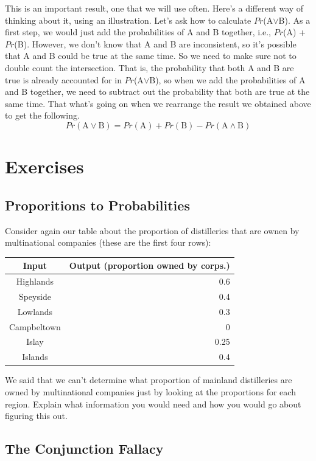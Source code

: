 \documentclass[]{tufte-book}
\begin{document}
This is an important result, one that we will use often. Here's a different way of thinking about it, using an illustration. Let's ask how to calculate \(Pr\)(A\(\vee\)B). As a first step, we would just add the probabilities of A and B together, i.e., \(Pr\)(A) + \(Pr\)(B). However, we don't know that A and B are inconsistent, so it's possible that A and B could be true at the same time. So we need to make sure not to double count the intersection. That is, the probability that both A and B are true is already accounted for in \(Pr\)(A\(\vee\)B), so when we add the probabilities of A and B together, we need to subtract out the probability that both are true at the same time. That what's going on when we rearrange the result we obtained above to get the following.
\[
 Pr(\text{A}\vee\text{B}) = Pr(\text{A}) + Pr(\text{B}) - Pr(\text{A}\wedge\text{B}) 
\]

\hypertarget{exercises-7}{%
\section{Exercises}\label{exercises-7}}

\hypertarget{proporitions-to-probabilities}{%
\subsection{Proporitions to Probabilities}\label{proporitions-to-probabilities}}

Consider again our table about the proportion of distilleries that are ownen by multinational companies (these are the first four rows):

\begin{longtable}[]{@{}cr@{}}
\toprule
Input & Output (proportion owned by corps.)\tabularnewline
\midrule
\endhead
Highlands & 0.6\tabularnewline
Speyside & 0.4\tabularnewline
Lowlands & 0.3\tabularnewline
Campbeltown & 0\tabularnewline
Islay & 0.25\tabularnewline
Islands & 0.4\tabularnewline
\bottomrule
\end{longtable}

We said that we can't determine what proportion of mainland distilleries are owned by multinational companies just by looking at the proportions for each region. Explain what information you would need and how you would go about figuring this out.

\hypertarget{the-conjunction-fallacy}{%
\subsection{The Conjunction Fallacy}\label{the-conjunction-fallacy}}
\end{document}

